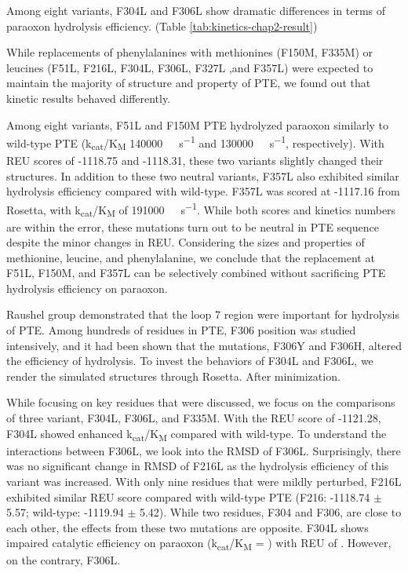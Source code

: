 \begin{refsection}
Among eight variants, F304L and F306L show dramatic differences in terms of
paraoxon hydrolysis efficiency. (Table \ref{tab:kinetics-chap2-result})

While replacements of phenylalanines with methionines (F150M, F335M) or
leucines (F51L, F216L, F304L, F306L, F327L ,and F357L) were expected to
maintain the majority of structure and property of PTE, we found out that
kinetic results behaved differently.  

Among eight variants, F51L and F150M PTE hydrolyzed paraoxon similarly to
wild-type PTE (k\textsubscript{cat}/K\textsubscript{M}
\SI{140000}{\per\Molar\per\second} and \SI{130000}{\per\Molar\per\second},
respectively). With REU scores of -1118.75 and -1118.31, these two variants
slightly changed their structures. In addition to these two neutral variants,
F357L also exhibited similar hydrolysis efficiency compared with wild-type.
F357L was scored at -1117.16 from Rosetta, with
k\textsubscript{cat}/K\textsubscript{M} of \SI{191000}{\per\Molar\per\second}.
While both scores and kinetics numbers are within the error, these mutations
turn out to be neutral in PTE sequence despite the minor changes in REU.
Considering the sizes and properties of methionine, leucine, and phenylalanine,
we conclude that the replacement at F51L, F150M, and F357L can be selectively
combined without sacrificing PTE hydrolysis efficiency on paraoxon.    

Raushel group demonstrated that the loop 7 region were important for hydrolysis
of PTE. Among hundreds of residues in PTE, F306 position was studied
intensively, and it had been shown that the mutations, F306Y and F306H, altered
the efficiency of hydrolysis\cite{Pavelka2009, Chen-Goodspeed2001a}. To invest
the behaviors of F304L and F306L, we render the simulated structures through
Rosetta. After minimization. 

While focusing on key residues that were
discussed\cite{Bigley2013b,Chen-Goodspeed2001a,Pavelka2009}, we focus on the
comparisons of three variant, F304L, F306L, and F335M. With the REU score of
-1121.28, F304L showed enhanced k\textsubscript{cat}/K\textsubscript{M}
compared with wild-type. To understand the interactions between F306L, we look
into the RMSD of F306L. Surprisingly, there was no significant change in RMSD
of F216L as the hydrolysis efficiency of this variant was increased. With only
nine residues that were mildly perturbed, F216L exhibited similar REU score
compared with wild-type PTE (F216: -1118.74 $\pm$ 5.57; wild-type: -1119.94
$\pm$ 5.42).  While two residues, F304 and F306, are
close to each other, the effects from these two mutations are opposite. F304L
shows impaired catalytic efficiency on paraoxon
(k\textsubscript{cat}/K\textsubscript{M} =  ) with REU of . However, on the
contrary, F306L. 


\end{refsection}
